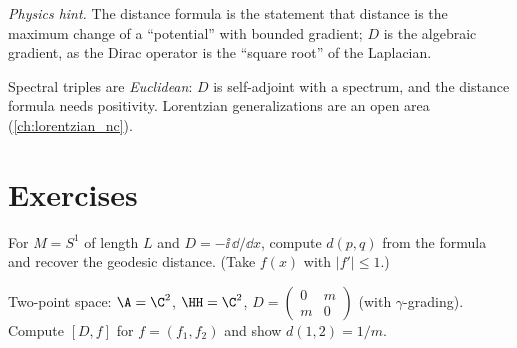 \emph{Physics hint.} The distance formula is the statement that distance is the maximum change of a ``potential'' with bounded gradient; $D$ is the algebraic gradient, as the Dirac operator is the ``square root'' of the Laplacian.

\begin{whatwrong}
Spectral triples are \emph{Euclidean}: $D$ is self-adjoint with a spectrum, and the distance formula needs positivity. Lorentzian generalizations are an open area (\cref{ch:lorentzian_nc}).
\end{whatwrong}

\section*{Exercises}
\begin{exercise}
For $M=S^1$ of length $L$ and $D=-\ii\,\dd/\dd x$, compute $d(p,q)$ from the formula and recover the geodesic distance. (Take $f(x)$ with $|f'|\le1$.)
\end{exercise}
\begin{exercise}
Two-point space: $\A=\C^2$, $\HH=\C^2$, $D=\begin{pmatrix}0&m\\m&0\end{pmatrix}$ (with $\gamma$-grading). Compute $[D,f]$ for $f=(f_1,f_2)$ and show $d(1,2)=1/m$.
\end{exercise}

